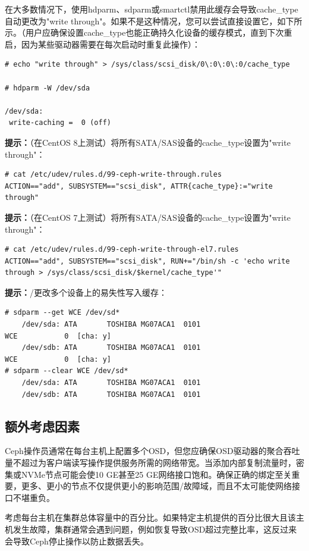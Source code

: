 \documentclass[12pt,UTF8]{ctexbook}
\begin{document}
在大多数情况下，使用hdparm、sdparm或smartctl禁用此缓存会导致cache_type自动更改为"write through"。如果不是这种情况，您可以尝试直接设置它，如下所示。（用户应确保设置cache_type也能正确持久化设备的缓存模式，直到下次重启，因为某些驱动器需要在每次启动时重复此操作）：
\begin{verbatim}
# echo "write through" > /sys/class/scsi_disk/0\:0\:0\:0/cache_type

# hdparm -W /dev/sda

/dev/sda:
 write-caching =  0 (off)
\end{verbatim}

\textbf{提示：}（在CentOS 8上测试）将所有SATA/SAS设备的cache_type设置为"write through"：
\begin{verbatim}
# cat /etc/udev/rules.d/99-ceph-write-through.rules
ACTION=="add", SUBSYSTEM=="scsi_disk", ATTR{cache_type}:="write through"
\end{verbatim}

\textbf{提示：}（在CentOS 7上测试）将所有SATA/SAS设备的cache_type设置为"write through"：
\begin{verbatim}
# cat /etc/udev/rules.d/99-ceph-write-through-el7.rules
ACTION=="add", SUBSYSTEM=="scsi_disk", RUN+="/bin/sh -c 'echo write through > /sys/class/scsi_disk/$kernel/cache_type'"
\end{verbatim}

\textbf{提示：}/更改多个设备上的易失性写入缓存：
\begin{verbatim}
# sdparm --get WCE /dev/sd*
    /dev/sda: ATA       TOSHIBA MG07ACA1  0101
WCE           0  [cha: y]
    /dev/sdb: ATA       TOSHIBA MG07ACA1  0101
WCE           0  [cha: y]
# sdparm --clear WCE /dev/sd*
    /dev/sda: ATA       TOSHIBA MG07ACA1  0101
    /dev/sdb: ATA       TOSHIBA MG07ACA1  0101
\end{verbatim}

\subsection{额外考虑因素}
Ceph操作员通常在每台主机上配置多个OSD，但您应确保OSD驱动器的聚合吞吐量不超过为客户端读写操作提供服务所需的网络带宽。当添加内部复制流量时，密集或NVMe节点可能会使10 GE甚至25 GE网络接口饱和。确保正确的绑定至关重要，更多、更小的节点不仅提供更小的影响范围/故障域，而且不太可能使网络接口不堪重负。

考虑每台主机在集群总体容量中的百分比。如果特定主机提供的百分比很大且该主机发生故障，集群通常会遇到问题，例如恢复导致OSD超过完整比率，这反过来会导致Ceph停止操作以防止数据丢失。
\end{document}
